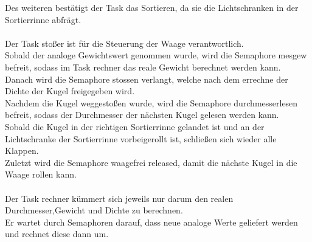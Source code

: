 \documentclass[12pt,a4paper]{article}
\begin{document}
Des weiteren bestätigt der Task das Sortieren, da sie die Lichtschranken in der Sortierrinne abfrägt.\\
\\
Der Task stoßer ist für die Steuerung der Waage verantwortlich.\\
Sobald der analoge Gewichtswert genommen wurde, wird die Semaphore mesgew befreit, sodass im Task rechner das reale Gewicht berechnet werden kann.\\
Danach wird die Semaphore stossen verlangt, welche nach dem errechne der Dichte der Kugel freigegeben wird.\\
Nachdem die Kugel weggestoßen wurde, wird die Semaphore durchmesserlesen befreit, sodass der Durchmesser der nächsten Kugel gelesen werden kann.\\
Sobald die Kugel in der richtigen Sortierrinne gelandet ist und an der Lichtschranke der Sortierrinne vorbeigerollt ist, schließen sich wieder alle Klappen.\\
Zuletzt wird die Semaphore waagefrei released, damit die nächste Kugel in die Waage rollen kann.\\
\\
Der Task rechner kümmert sich jeweils nur darum den realen Durchmesser,Gewicht und Dichte zu berechnen.\\
Er wartet durch Semaphoren darauf, dass neue analoge Werte geliefert werden und rechnet diese dann um.\\



 

\newpage
\end{document}
